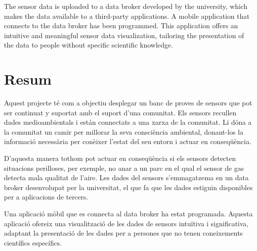 \documentclass[12pt, a4paper,twoside]{tesi_upf}
\begin{document}
  The sensor data is uploaded to a data broker developed by the university, which makes the data available to a third-party applications. 
  A mobile application that connects to the data broker has been programmed. 
  This application offers an intuitive and meaningful sensor data visualization, tailoring the presentation of the data to people without specific scientific knowledge.


\section*{\Large \sffamily  Resum}

	Aquest projecte té com a objectiu desplegar un banc de proves de sensors que pot ser continuat y suportat amb el suport d'una comunitat.
	Els sensors recullen dades medioambientals i están connectats a una xarxa de la comunitat. Li dóna a la comunitat un camir per millorar la seva consciència ambiental, donant-los la informació necessària per conèixer l'estat del seu entorn i actuar en conseqüència. 
	
	D'aquesta manera tothom pot actuar en conseqüència si els sensors detecten situacions perilloses, per exemple, no anar a un parc en el qual el sensor de gas detecta mala qualitat de l'aire.
	Les dades del sensors s'emmagatzema en un data broker desenvolupat per la universitat, el que fa que les dades estiguin disponibles per a aplicacions de tercers.
	
	Una aplicació mòbil que es connecta al data broker ha estat programada. 
	Aquesta aplicació ofereix una visualització de les dades de sensors intuïtiva i significativa, adaptant la presentació de les dades per a persones que no tenen coneixements científics específics.


\cleardoublepage

%


\tableofcontents

\listoffigures

\listoftables
\end{document}
